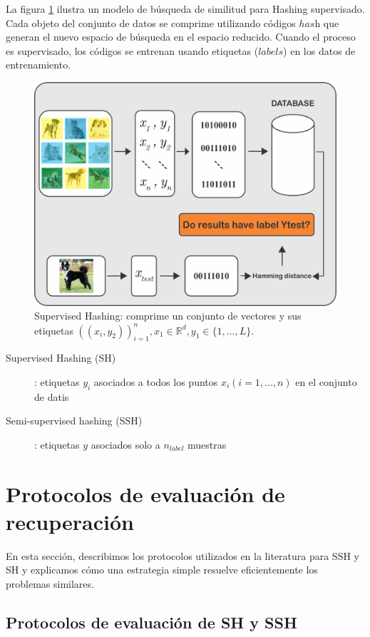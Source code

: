  La figura \ref{supervisedhashingcap5} ilustra un modelo de búsqueda de similitud para Hashing supervisado. Cada objeto del conjunto de datos se comprime utilizando códigos $has$h que generan el nuevo espacio de búsqueda en el espacio reducido. Cuando el proceso es supervisado, los códigos se entrenan usando etiquetas ($labels$) en los datos de entrenamiento.
\begin{figure}[htp]
\includegraphics[width=0.7\columnwidth]{chapter5/ima2.png}
\centering
\caption{ Supervised Hashing: comprime un conjunto de vectores y sus etiquetas $((x_i,y_2))^{n}_{i=1}, x_1\in \mathbb{R}^{d}, y_1 \in \{1,...,L\} $.}
\label{supervisedhashingcap5}
\end{figure}

\begin{description}
\item [Supervised Hashing (SH)] : etiquetas $ y_i $ asociados a todos los puntos $ x_i (i = 1, ..., n) $ en el conjunto de datis
\item [Semi-supervised hashing (SSH)] : etiquetas $ y $ asociados solo a  $ n_{label} $ muestras
\end{description}

\section{Protocolos de evaluación de recuperación}

En esta sección, describimos los protocolos utilizados en la literatura para SSH y SH y explicamos cómo una estrategia simple resuelve eficientemente los problemas similares.

\subsection{Protocolos de evaluación de SH y SSH}

